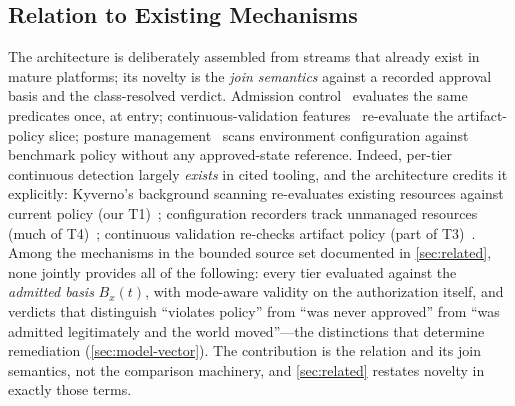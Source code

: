\subsection{Relation to Existing Mechanisms}
The architecture is deliberately assembled from streams that already exist in
mature platforms; its novelty is the \emph{join semantics} against a recorded
approval basis and the class-resolved verdict. Admission
control~\cite{k8sadmission,opa,kyverno} evaluates the same predicates once,
at entry; continuous-validation features~\cite{binauthz} re-evaluate the
artifact-policy slice; posture management~\cite{cspm} scans environment
configuration against benchmark policy without any approved-state reference.
Indeed, per-tier continuous detection largely \emph{exists} in cited
tooling, and the architecture credits it explicitly: Kyverno's background
scanning re-evaluates existing resources against current policy (our
T1)~\cite{kyverno}; configuration recorders track unmanaged resources
(much of T4)~\cite{awsconfig,cspm}; continuous validation re-checks
artifact policy (part of T3)~\cite{binauthz}. Among the mechanisms in the
bounded source set documented in \cref{sec:related}, none jointly provides all
of the following: every tier evaluated against the
\emph{admitted basis} $B_x(t)$, with mode-aware validity on the authorization
itself, and verdicts that distinguish ``violates policy'' from ``was never
approved'' from ``was admitted legitimately and the world moved''---the
distinctions that determine remediation (\cref{sec:model-vector}). The
contribution is the relation and its join semantics, not the comparison
machinery, and \cref{sec:related} restates novelty in exactly those terms.
